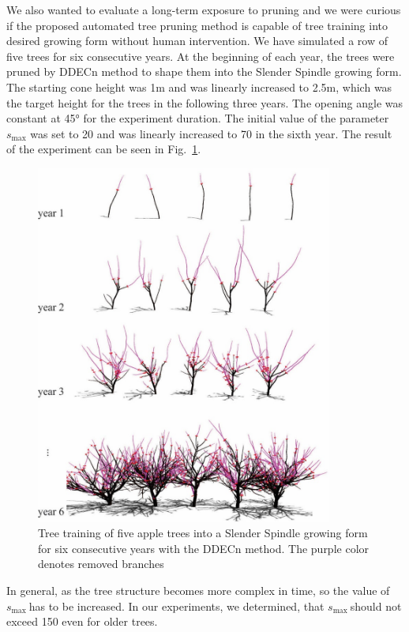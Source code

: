 \documentclass[1p]{elsarticle}
\begin{document}
We also wanted to evaluate a long-term exposure to pruning and we were
curious if the proposed automated tree pruning method is capable of tree
training into desired growing form without human intervention. We have
simulated a row of five trees for six consecutive years. At the
beginning of each year, the trees were pruned by DDECn method to shape
them into the Slender Spindle growing form. The starting cone height was
1m and was linearly increased to 2.5m, which was the target height for
the trees in the following three years. The opening angle was constant
at 45° for the experiment duration. The initial value of the parameter
\(s_{\mathrm{\max}}\) was set to 20 and was linearly increased to 70 in
the sixth year. The result of the experiment can be seen in Fig.~\ref{fig:my_figure7}.

\begin{figure}[hbt]
    \centering
    \includegraphics[width=3.84333in,height=4.66333in]{figs/image7.jpeg}
    \caption{Tree training of five apple trees into a Slender
Spindle growing form for six consecutive years with the DDECn method.
The purple color denotes removed branches}
    \label{fig:my_figure7}
\end{figure}


In general, as the tree structure becomes more complex in time, so the
value of \(s_{\mathrm{\max}}\ \)has to be increased. In our experiments,
we determined, that \(s_{\mathrm{\max}}\ \)should not exceed 150 even
for older trees.
\end{document}
